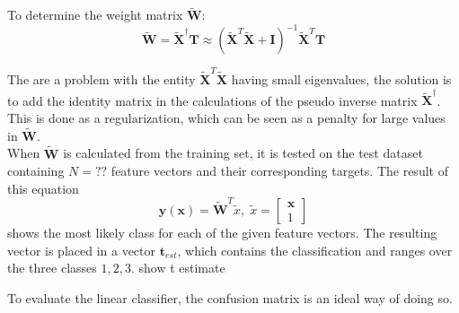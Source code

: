 To determine the weight matrix $\tilde{\mathbf{W}}$:
\begin{equation}
\tilde{\mathbf{W}} = \tilde{\mathbf{X}}^\dagger \mathbf{T} \approx  (\tilde{\mathbf{X}}^T \tilde{\mathbf{X}}+\mathbf{I})^{-1} \tilde{\mathbf{X}}^T\mathbf{T}
\label{eq:weightVector}  
\end{equation}

The are a problem with the entity $\tilde{\mathbf{X}}^T \tilde{\mathbf{X}}$ having small eigenvalues, the solution is to add the identity matrix in the calculations of the pseudo inverse matrix $\tilde{\mathbf{X}}^\dagger$.
This is done as a regularization, which can be seen as a penalty for large values in $\tilde{\mathbf{W}}$.\\

When $\tilde{\mathbf{W}}$ is calculated from the training set, it is tested on the test dataset containing $N = ??$ feature vectors and their corresponding targets. 
The result of this equation
\begin{equation}
\mathbf{y}(\mathbf{x}) = \tilde{\mathbf{W}}^{T} \tilde{x},
\;
\tilde{x} = \left[\begin{array}{c}
\mathbf{x}\\ 1
\end{array} \right] 
\label{eq:Yclassifier}
\end{equation}
shows the most likely class for each of the given feature vectors. 
The resulting vector is placed in a vector $\mathbf{t}_{est}$, which contains the classification and ranges over the three classes ${1,2,3}$. show t estimate %

To evaluate the linear classifier, the confusion matrix is an ideal way of doing so.


